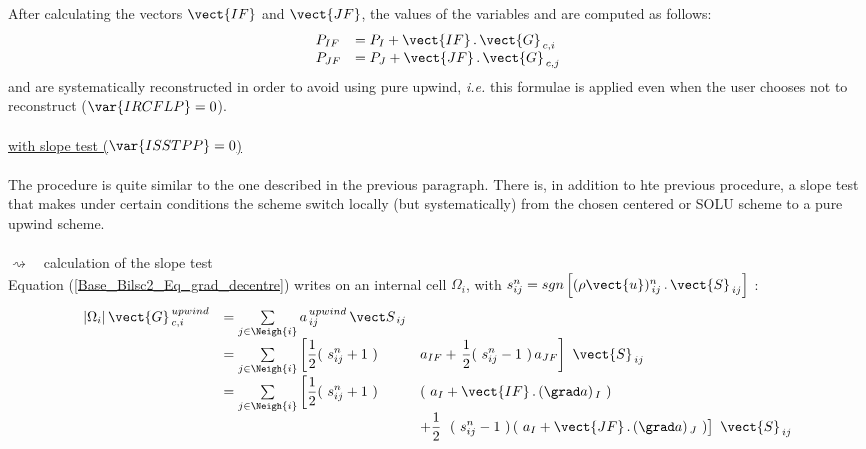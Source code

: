 After calculating the vectors $\vect{IF}$ and $\vect{JF}$, the values of the variables  and  are computed as follows:
\begin{equation}
\begin{array}{ll}
P_{IF} &= P_I + \vect{IF}\,.\,\vect{G}_{\,c,i}\\
P_{JF} &= P_J + \vect{JF}\,.\,\vect{G}_{\,c,j}\\
\end{array}
\end{equation}
  and  are systematically reconstructed in order to avoid
using pure upwind, {\it i.e.} this formulae is applied even when the user 
chooses not to reconstruct ($\var{IRCFLP} = 0$).\\\\
\hspace*{2cm}{\tiny$\blacksquare$} \underline{ with slope test ($\var{ISSTPP}
= 0$)}\\\\
The procedure is quite similar to the one described in the previous paragraph. 
There is, in addition to hte previous procedure, a slope test that makes under 
certain conditions the scheme switch locally (but systematically) from the chosen
 centered or SOLU scheme to a pure upwind scheme. \\\\
\hspace*{2.5cm}$\rightsquigarrow$\ \ calculation of the slope test\\
Equation (\ref{Base_Bilsc2_Eq_grad_decentre}) writes on an internal cell
$\Omega_i$, with
$ s^n_{ij} = sgn \left[(\rho\vect{u})_{\,ij}^n\,.\,\vect{S}_{\,ij}\right]$ :\\
\begin{equation}\notag
\begin{array}{lll}
|\Omega_i|\,\vect{G}^{\,upwind}_{\,c,i}&=
\sum\limits_{j\in \Neigh{i}}a^{\,upwind}_{\,ij}\,{\vect S_{\,ij}} \\
&=\sum\limits_{j\in
\Neigh{i}}\left[\displaystyle\frac{1}{2}(\ s^n_{ij} + 1\ )\right.&a_{IF} +
\left.\displaystyle\frac{1}{2}(\ s^n_{ij} - 1\ )\,a_{JF}\right]\ \vect{S}_{\,ij}\\
&=\sum\limits_{j\in
\Neigh{i}}\left[\displaystyle\frac{1}{2}(\ s^n_{ij} + 1\ )\right.&(\ a_I + \vect {IF}\,.\,(\grad a)_{\,I}\ ) \\
& &
+\displaystyle\frac{1}{2}\ \left.(\ s^n_{ij} - 1\ )\,(\ a_I + \vect{JF}\,.\,(\grad a)_{\,J}\ )\right]\ \vect{S}_{\,ij}
\end{array}
\end{equation}\\

